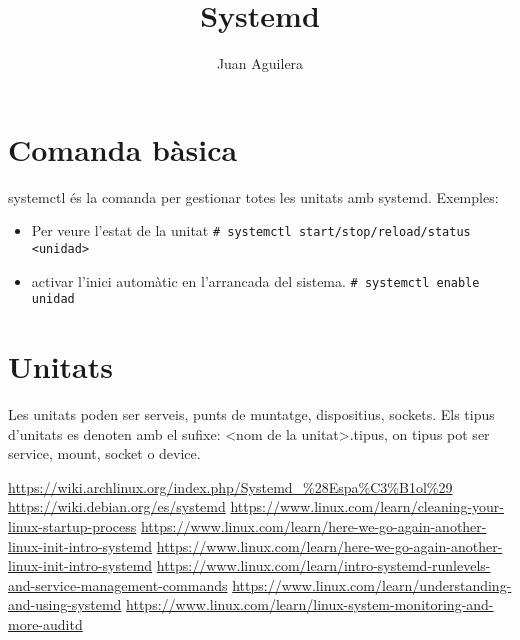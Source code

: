 \documentclass[a4paper]{article}
\begin{document}
\title{Systemd}
\author{Juan Aguilera}
\maketitle

\begin{comment}
oddsidemargin \the\oddsidemargin \newline
textwidth \the\textwidth \newline
marginparsep \the\marginparsep \newline
marginparwidth \the\marginparwidth \newline
hoffset \the\hoffset \newline
paperwidth \the\paperwidth 
\end{comment}

\section{Comanda bàsica}
systemctl és la comanda per gestionar totes les unitats amb systemd. Exemples:
\begin{itemize}
	\item Per veure l'estat de la unitat  \newline
	\verb+# systemctl start/stop/reload/status <unidad>+ 
	\item activar l'inici automàtic en l'arrancada del sistema. \newline
	\verb+# systemctl enable unidad+ 
\end{itemize}

\section{Unitats}

Les unitats poden ser serveis, punts de muntatge, dispositius, sockets. Els tipus d'unitats es denoten amb el sufixe: <nom de la unitat>.tipus, on tipus pot ser service, mount, socket o device.

\begin{thebibliography}{99}
	 \url{https://wiki.archlinux.org/index.php/Systemd_%28Espa%C3%B1ol%29}
	 \url{https://wiki.debian.org/es/systemd}
	 \url{https://www.linux.com/learn/cleaning-your-linux-startup-process}
	 \url{https://www.linux.com/learn/here-we-go-again-another-linux-init-intro-systemd}
	 \url{https://www.linux.com/learn/here-we-go-again-another-linux-init-intro-systemd}
	 \url{https://www.linux.com/learn/intro-systemd-runlevels-and-service-management-commands}
	 \url{https://www.linux.com/learn/understanding-and-using-systemd}
	\url{https://www.linux.com/learn/linux-system-monitoring-and-more-auditd}
		

	
\end{thebibliography}
\end{document}
